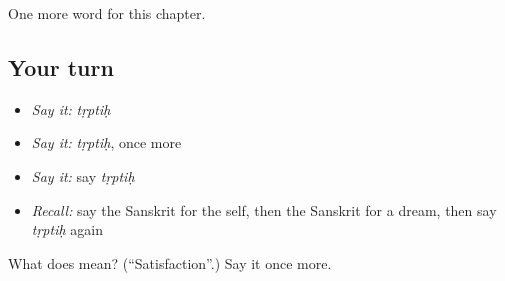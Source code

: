 \begin{grammarlens}[title={What you've built}]
One more word for this chapter.
\end{grammarlens}

\subsection*{Your turn}
\begin{itemize}
\raggedright
  \item \emph{Say it:} \emph{tṛptiḥ}
  \item \emph{Say it:} \emph{tṛptiḥ}, once more
  \item \emph{Say it:} say \emph{tṛptiḥ}
  \item \emph{Recall:} say the Sanskrit for the self, then the Sanskrit for a dream, then say \emph{tṛptiḥ} again
\end{itemize}

\begin{tcolorbox}[breakable,colback=teal!4,colframe=teal!35!black,title={Before you move on}]
What does  mean? (\textquotedblleft{}Satisfaction\textquotedblright{}.) Say it once more.
\end{tcolorbox}
